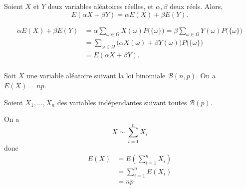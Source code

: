 \begin{thm}
	Soient $X$ et $Y$ deux variables aléatoires réelles, et $\alpha, \beta$ deux réels. Alors, \[
		E(\alpha X + \beta Y) = \alpha E(X) + \beta E(Y)
	.\]
\end{thm}

\begin{prv}
	\begin{align*}
		\alpha E(X) + \beta E(Y) &= \alpha \sum_{\omega \in \Omega}X(\omega) P\big(\{\omega\}\big) = \beta \sum_{\omega \in \Omega} Y(\omega)P\big(\{\omega\}\big) \\
		&= \sum_{\omega \in \Omega}\big(\alpha X(\omega) + \beta Y(\omega)\big) P\big(\{\omega\}\big) \\
		&= E(\alpha X + \beta Y). \\
	\end{align*}
\end{prv}

\begin{crlr}
	Soit $X$ une variable aléatoire suivant la loi binomiale $\mathcal{B}(n,p)$. On a $E (X) = np$.
\end{crlr}

\begin{prv}
	Soient $X_1, \ldots,X_n$ des variables indépendantes suivant toutes $\mathcal{B}(p)$.
	
	On a \[
		X \sim \sum_{i = 1}^n X_i
	\] donc
	\begin{align*}
		E(X) &= E\left( \sum_{i=1}^n X_i \right) \\
		&= \sum_{i=1}^n E(X_i)\\
		&= np \\
	\end{align*}
\end{prv}

